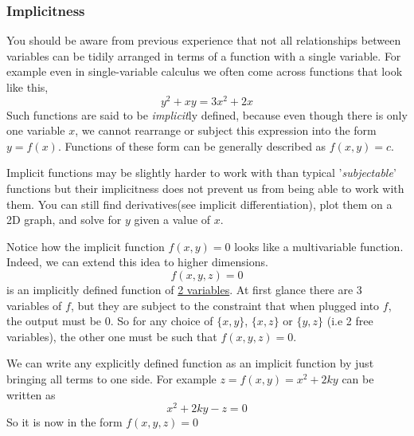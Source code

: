 \documentclass[14pt]{article}
\begin{document}
	\subsubsection{Implicitness}
	You should be aware from previous experience that not all relationships between variables can be tidily arranged in terms of a function with a single variable. For example even in single-variable calculus we often come across functions that look like this,
	\begin{equation*}
		y^2 + xy = 3x^2 + 2x
	\end{equation*}
	Such functions are said to be \textit{implicit}ly defined, because even though there is only one variable $x$, we cannot rearrange or subject this expression into the form $y = f(x)$. Functions of these form can be generally described as $f(x,y)=c$. 
	
	Implicit functions may be slightly harder to work with than typical '\textit{subjectable}' functions but their implicitness does not prevent us from being able to work with them. You can still find derivatives{\footnotesize (see implicit differentiation)}, plot them on a 2D graph, and solve for $y$ given a value of $x$.
	
	Notice how the implicit function $f(x, y) = 0$ looks like a multivariable function. Indeed, we can extend this idea to higher dimensions. 
	\begin{equation*}
		f(x, y, z) = 0
	\end{equation*}
	is an implicitly defined function of \underline{2 variables}. At first glance there are 3 variables of $f$, but they are subject to the constraint that when plugged into $f$, the output must be 0. So for any choice of $\{x, y \}$, $\{x, z\}$ or $\{y, z\}$ {\footnotesize (i.e 2 free variables)}, the other one must be such that $f(x, y, z) = 0$.
	
	We can write any explicitly defined function as an implicit function by just bringing all terms to one side. For example $z=f(x,y)= x^2 + 2ky$ can be written as 
	\begin{equation*}
		x^2 + 2ky - z = 0
	\end{equation*}
	So it is now in the form $f(x, y, z) = 0$
	
\end{document}
